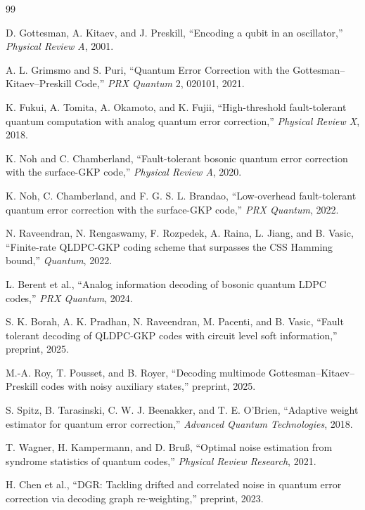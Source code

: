 \documentclass[11pt]{article}
\begin{document}
\begin{thebibliography}{99}

D. Gottesman, A. Kitaev, and J. Preskill,
``Encoding a qubit in an oscillator,''
\emph{Physical Review A}, 2001.

A. L. Grimsmo and S. Puri,
``Quantum Error Correction with the Gottesman--Kitaev--Preskill Code,''
\emph{PRX Quantum} 2, 020101, 2021.

K. Fukui, A. Tomita, A. Okamoto, and K. Fujii,
``High-threshold fault-tolerant quantum computation with analog quantum error
correction,''
\emph{Physical Review X}, 2018.

K. Noh and C. Chamberland,
``Fault-tolerant bosonic quantum error correction with the surface-GKP code,''
\emph{Physical Review A}, 2020.

K. Noh, C. Chamberland, and F. G. S. L. Brandao,
``Low-overhead fault-tolerant quantum error correction with the surface-GKP
code,''
\emph{PRX Quantum}, 2022.

N. Raveendran, N. Rengaswamy, F. Rozpedek, A. Raina, L. Jiang, and B. Vasic,
``Finite-rate QLDPC-GKP coding scheme that surpasses the CSS Hamming bound,''
\emph{Quantum}, 2022.

L. Berent et al.,
``Analog information decoding of bosonic quantum LDPC codes,''
\emph{PRX Quantum}, 2024.

S. K. Borah, A. K. Pradhan, N. Raveendran, M. Pacenti, and B. Vasic,
``Fault tolerant decoding of QLDPC-GKP codes with circuit level soft
information,''
preprint, 2025.

M.-A. Roy, T. Pousset, and B. Royer,
``Decoding multimode Gottesman--Kitaev--Preskill codes with noisy auxiliary
states,''
preprint, 2025.

S. Spitz, B. Tarasinski, C. W. J. Beenakker, and T. E. O'Brien,
``Adaptive weight estimator for quantum error correction,''
\emph{Advanced Quantum Technologies}, 2018.

T. Wagner, H. Kampermann, and D. Bru{\ss},
``Optimal noise estimation from syndrome statistics of quantum codes,''
\emph{Physical Review Research}, 2021.

H. Chen et al.,
``DGR: Tackling drifted and correlated noise in quantum error correction via
decoding graph re-weighting,''
preprint, 2023.


\end{thebibliography}
\end{document}
